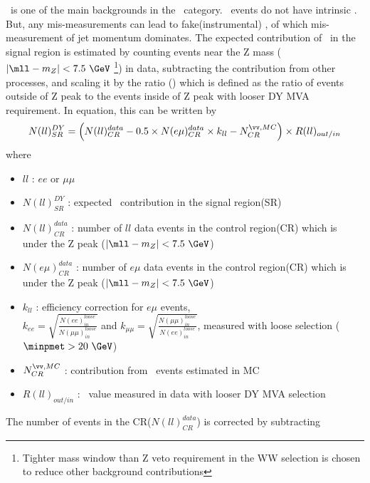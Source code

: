 \dyll\ is one of the main backgrounds in the \SF\ category.   
\dyll\ events do not have intrinsic \met. But, any mis-measurements can 
lead to fake(instrumental) \met, of which mis-measurement of jet momentum dominates.  
The expected contribution of \dyll\ in the signal region is estimated by 
counting events near the Z mass ($|\mll - m_Z| < 7.5~\GeV$
\footnote{Tighter mass window than Z veto requirement in the WW selection is chosen
to reduce other background contributions}) in data, subtracting 
the contribution from other processes, and scaling it by the ratio (\routin) 
which is defined as the ratio of events outside of Z peak to the events inside
of Z peak with looser DY MVA requirement. In equation, this can be written by 
\begin{eqnarray} 
N(ll)^{DY}_{SR} 
= 
\left( N(ll)_{CR}^{data} - 0.5 \times N(e\mu)_{CR}^{data} \times k_{ll} - N_{CR}^{\vv, MC} \right) 
\times R(ll)_{out/in}
\end{eqnarray} 
where 
\begin{itemize}
\item $ll$ : $ee$ or $\mu\mu$ 
\item $N(ll)^{DY}_{SR}$ : expected \dyll\ contribution in the signal region(SR) 
\item $N(ll)_{CR}^{data}$ : number of $ll$ data events in the control region(CR) which is 
      under the Z peak ($|\mll - m_Z| < 7.5~\GeV$)  
\item $N(e\mu)_{CR}^{data}$ : number of $e\mu$ data events in the control region(CR) which is 
      under the Z peak ($|\mll - m_Z| < 7.5~\GeV$)  
\item $k_{ll}$ : efficiency correction for $e\mu$ events,  \\
      $\displaystyle k_{ee} = \sqrt{\frac{N(ee)_{in}^{loose}}{N(\mu\mu)_{in}^{loose}}}$  and   
      $\displaystyle k_{\mu\mu} = \sqrt{\frac{N(\mu\mu)_{in}^{loose}}{N(ee)_{in}^{loose}}}$,
      measured with loose selection ($\minpmet > 20~\GeV$) 
\item $N_{CR}^{\vv, MC}$ : contribution from \vv\ events estimated in MC
\item $R(ll)_{out/in}$ : \routin\ value measured in data with looser DY MVA selection
\end{itemize}
The number of events in the CR($N(ll)_{CR}^{data}$) is corrected by subtracting

